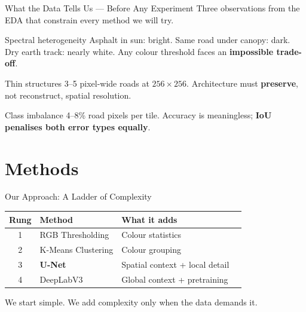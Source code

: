 \documentclass{beamer}
\begin{document}
\begin{frame}{What the Data Tells Us --- Before Any Experiment}
  Three observations from the EDA that constrain every method we will try.
  \vspace{0.3em}
  \begin{block}{Spectral heterogeneity}
    Asphalt in sun: bright. Same road under canopy: dark. Dry earth track: nearly white.
    Any colour threshold faces an \textbf{impossible trade-off}.
  \end{block}
  \vspace{0.2em}
  \begin{block}{Thin structures}
    3--5 pixel-wide roads at $256\times256$.
    Architecture must \textbf{preserve}, not reconstruct, spatial resolution.
  \end{block}
  \vspace{0.2em}
  \begin{block}{Class imbalance}
    4--8\% road pixels per tile.
    Accuracy is meaningless; \textbf{IoU penalises both error types equally}.
  \end{block}
\end{frame}

\section{Methods}

\begin{frame}{Our Approach: A Ladder of Complexity}
  \begin{center}
    \begin{tabular}{clll}
      \toprule
      Rung & Method & What it adds \\
      \midrule
      1 & RGB Thresholding       & Colour statistics \\
      2 & K-Means Clustering     & Colour grouping \\
      3 & \textbf{U-Net}         & Spatial context + local detail \\
      4 & DeepLabV3              & Global context + pretraining \\
      \bottomrule
    \end{tabular}
  \end{center}
  \vspace{0.8em}
  \centering
  We start simple. We add complexity only when the data demands it.
\end{frame}
\end{document}
